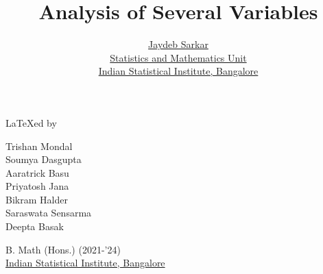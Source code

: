 \documentclass{report}
\title{\Huge\sffamily Analysis of Several Variables}
\author{{\LARGE\sffamily \href{https://www.isibang.ac.in/~jay/}{Jaydeb Sarkar}} \\[0.5cm]
  \href{https://www.isibang.ac.in/~statmath}{Statistics and Mathematics Unit} \\
  \href{https://www.isibang.ac.in}{Indian Statistical Institute, Bangalore}}
\date{}
\begin{document}



\maketitle

{\vspace*{\fill}\centering
  {\LARGE \LaTeX ed by}
  \vspace{0.5cm}
  \begin{center}
    \large
    Trishan Mondal \\
    Soumya Dasgupta \\
    Aaratrick Basu \\
    Priyatosh Jana \\
    Bikram Halder \\
    Saraswata Sensarma \\
    Deepta Basak
  \end{center}
  \vspace{0.5cm}
  \begin{center}
    B. Math (Hons.) (2021-'24) \\
    \href{https://www.isibang.ac.in}{Indian Statistical Institute, Bangalore}
  \end{center}
  \vspace*{\fill}}

\tableofcontents





























\end{document}
